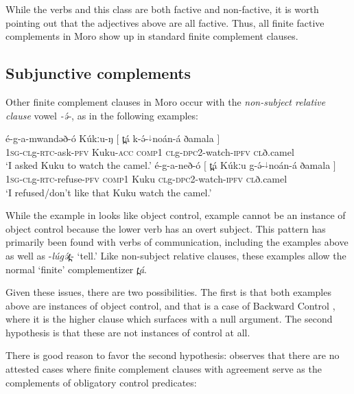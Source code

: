 While the verbs and this class are both factive and non-factive, it is worth pointing out that the adjectives above are all factive. Thus, all finite factive complements in Moro show up in standard finite complement clauses. %

\subsection{Subjunctive complements}\label{sec:ch15:dpc2}

Other finite complement clauses in Moro occur with the \textit{non-subject relative clause} vowel \textit{-ə́-}, as in the following examples:

\ea \ea  \gll 	é-g-a-mwandəð-ó Kúkːu-ŋ   $[$ t̪á k-{ə́}-$^{↓}$noán-á ðamala $]$\\
\textsc{1sg-cl}g-\textsc{rtc}-ask-\textsc{pfv} Kuku-\textsc{acc} {} \textsc{comp1} \textsc{cl}g-\textsc{dpc2}-watch-\textsc{ipfv} \textsc{cl}ð.camel {}\\
\glt ‘I asked Kuku to watch the camel.’ \label{ex:ch15:camel1}
\ex  \gll   é-g-a-neð-ó   $[$ t̪á Kúkːu g-{ə́}-$^{↓}$noán-á ðamala $]$\\
\textsc{1sg-cl}g-\textsc{rtc}-refuse-\textsc{pfv} {}  \textsc{comp1} Kuku \textsc{cl}g-\textsc{dpc2}-watch-\textsc{ipfv} \textsc{cl}ð.camel {}\\
\glt ‘I refused/don’t like that Kuku watch the camel.’ \label{ex:ch15:camel2}
\z 
\z 

While the example in  looks like object control, example  cannot be an instance of object control because the lower verb has an overt subject.  This pattern has primarily been found with verbs of communication, including the examples above as well as -\textit{lúgə́t̪}- `tell.' Like non-subject relative clauses, these examples allow the normal `finite' complementizer \textit{t̪á}.

Given these issues, there are two possibilities. The first is that both examples above are instances of object control, and that   is a case of Backward Control \citep{polinsky02}, where it is the higher clause which surfaces with a null argument. The second hypothesis is that these are not instances of control at all.

There is good reason to favor the second hypothesis: \citet{landau13} observes that there are no attested cases where finite complement clauses with agreement serve as the complements of obligatory control predicates:

